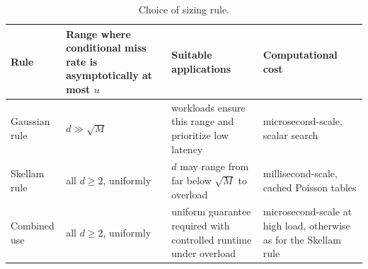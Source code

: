 \begin{table}[!htbp]
\centering
\caption{Choice of sizing rule.}
\label{tab:sizing-options}
\begin{tabular}{@{}p{.19\linewidth}p{.24\linewidth}p{.29\linewidth}p{.18\linewidth}@{}}
\toprule
Rule & Range where conditional miss rate is asymptotically at most $u$ & Suitable applications & Computational cost\\
\midrule
Gaussian rule & $d\gg\sqrt M$ & workloads ensure this range and prioritize low latency & microsecond-scale, scalar search\\
Skellam rule & all $d\ge2$, uniformly & $d$ may range from far below $\sqrt M$ to overload & millisecond-scale, cached Poisson tables\\
Combined use & all $d\ge2$, uniformly & uniform guarantee required with controlled runtime under overload & microsecond-scale at high load, otherwise as for the Skellam rule\\
\bottomrule
\end{tabular}
\end{table}
